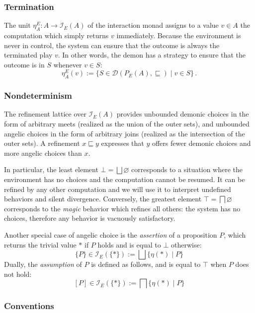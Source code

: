 \documentclass[format=sigplan,authordraft]{acmart}
\begin{document}
\subsubsection{Termination}

The unit $\eta^E_A : A \rightarrow \mathcal{I}_E(A)$
of the interaction monad
assigns to a value $v \in A$ the computation
which simply returns $v$ immediately.
Because the environment is never in control,
the system can ensure that the outcome is always
the terminated play $v$.
In other words,
the demon has a strategy to ensure that the outcome is in $S$
whenever $v \in S$:
\[
  \eta^E_A(v) :=
    \{ S \in \mathcal{D}(P_E(A), {\sqsubseteq}) \mid v \in S \} \,.
\]

\subsubsection{Nondeterminism}

The refinement lattice over $\mathcal{I}_E(A)$
provides unbounded demonic choices
in the form of arbitrary meets
(realized as the union of the outer sets),
and unbounded angelic choices
in the form of arbitrary joins
(realized as the intersection of the outer sets).
A refinement $x \sqsubseteq y$ expresses that
$y$ offers fewer demonic choices and more angelic choices than $x$.

In particular,
the least element $\bot = \bigsqcup \varnothing$
corresponds to a situation where the environment has no choices
and the computation cannot be resumed.
It can be refined by any other computation and
we will use it to interpret undefined behaviors and silent divergence.
Conversely,
the greatest element $\top = \bigsqcap \varnothing$
corresponds to the \emph{magic} behavior
which refines all others:
the system has no choices,
therefore any behavior is vacuously satisfactory.

Another special case of angelic choice is
the \emph{assertion} of a proposition $P$,
which returns the trivial value $*$ if $P$ holds
and is equal to $\bot$ otherwise:
\[ \{P\} \in \mathcal{I}_E(\{*\}) :=
    \bigsqcup \{ \eta(*) \mid P \} \]
Dually,
the \emph{assumption} of $P$
is defined as follows,
and is equal to $\top$ when $P$ does not hold:
\[ [P] \in \mathcal{I}_E(\{*\}) :=
    \bigsqcap \{ \eta(*) \mid P \} \]

\subsubsection{Conventions}
\end{document}
